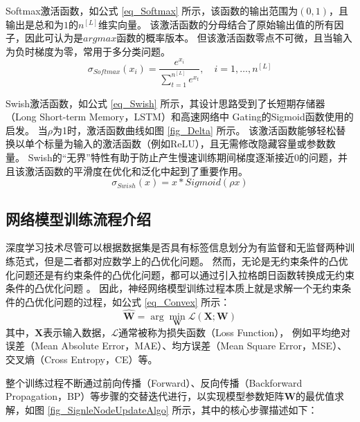 \documentclass{xdupgthesis}
\begin{document}
Softmax激活函数，如公式 \eqref{eq_Softmax} 所示，该函数的输出范围为$(0, 1)$，且输出是总和为$1$的$n^{[L]}$维实向量。
该激活函数的分母结合了原始输出值的所有因子，因此可认为是$argmax$函数的概率版本。
但该激活函数零点不可微，且当输入为负时梯度为零，常用于多分类问题。
\begin{equation}
    \sigma_{Softmax}\left( x_{i} \right) = 
        \frac{e^{x_{i}}}{\sum_{t = 1}^{n^{[L]}}e^{x_{t}}}, \quad i = 1, \dots, n^{[L]}
    \label{eq_Softmax}
\end{equation}

Swish激活函数，如公式 \eqref{eq_Swish} 所示，其设计思路受到了长短期存储器（Long Short-term Memory，LSTM）和高速网络中 Gating的Sigmoid函数使用的启发。
当$\rho$为1时，激活函数曲线如图 \ref{fig_Delta} 所示。
该激活函数能够轻松替换以单个标量为输入的激活函数（例如ReLU），且无需修改隐藏容量或参数数量。
Swish的“无界”特性有助于防止产生慢速训练期间梯度逐渐接近0的问题，并且该激活函数的平滑度在优化和泛化中起到了重要作用。
\begin{equation}
    \sigma_{Swish}\left( x \right) = x * Sigmoid(\rho x)
    \label{eq_Swish}
\end{equation}


\subsection{网络模型训练流程介绍}
\label{sec_ModelTrainProduce}
深度学习技术尽管可以根据数据集是否具有标签信息划分为有监督和无监督两种训练范式，但是二者都对应数学上的凸优化问题。
然而，无论是无约束条件的凸优化问题还是有约束条件的凸优化问题，都可以通过引入拉格朗日函数转换成无约束条件的凸优化问题 \cite{chen1985optimize}。
因此，神经网络模型训练过程本质上就是求解一个无约束条件的凸优化问题的过程，如公式 \eqref{eq_Convex} 所示：
\begin{equation}
    \mathbf{\hat{W}} = \arg\min_{\mathbf{W}}{\mathcal{L} \left(\mathbf{X; W} \right)}
    \label{eq_Convex}
\end{equation}
其中，$\mathbf{X}$表示输入数据，$\mathcal{L}$通常被称为损失函数（Loss Function），
例如平均绝对误差（Mean Absolute Error，MAE）、均方误差（Mean Square Error，MSE）、交叉熵（Cross Entropy，CE）等。

整个训练过程不断通过前向传播（Forward）、反向传播（Backforward Propagation，BP）等步骤的交替迭代进行，以实现模型参数矩阵$\mathbf{W}$的最优值求解，如图 \ref{fig_SignleNodeUpdateAlgo} 所示，其中的核心步骤描述如下：
\end{document}
